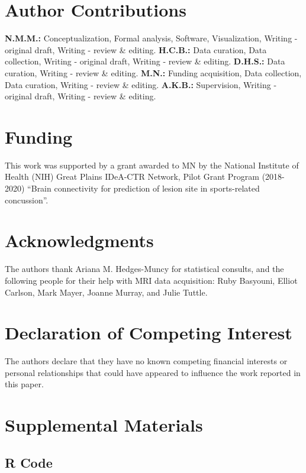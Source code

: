 \documentclass[]{imag-ms-template}
\begin{document}
\section*{Author Contributions}
\label{sec:xtr-auth}
\textbf{N.M.M.:} Conceptualization, Formal analysis, Software, Visualization, Writing - original draft, Writing - review \& editing. \textbf{H.C.B.:} Data curation, Data collection, Writing - original draft, Writing - review \& editing. \textbf{D.H.S.:} Data curation, Writing - review \& editing. \textbf{M.N.:} Funding acquisition, Data collection, Data curation, Writing - review \& editing. \textbf{A.K.B.:} Supervision, Writing - original draft, Writing - review \& editing.


\section*{Funding}
\label{sec:xtr-fund}
This work was supported by a grant awarded to MN by the National Institute of Health (NIH) Great Plains IDeA-CTR Network, Pilot Grant Program (2018-2020) ``Brain connectivity for prediction of lesion site in sports-related concussion''.


\section*{Acknowledgments}
\label{sec:xtr-ack}
The authors thank Ariana M. Hedges-Muncy for statistical consults, and the following people for their help with MRI data acquisition: Ruby Basyouni, Elliot Carlson, Mark Mayer, Joanne Murray, and Julie Tuttle.


\section*{Declaration of Competing Interest}
\label{sec:xtr-dci}
The authors declare that they have no known competing financial interests or personal relationships that could have appeared to influence the work reported in this paper.


\pagebreak
\printbibliography
\pagebreak


\section{Supplemental Materials}
\label{sec:supp-materials}
\beginsupplement

\subsection{R Code}
\label{ssec:supp-rcode}
\end{document}
